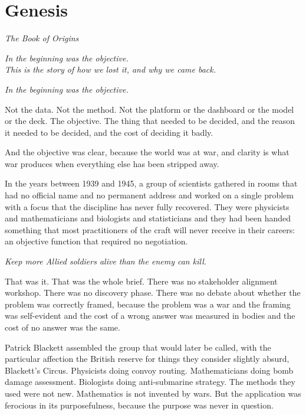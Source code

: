 \chapter{Genesis}
\begin{center}
  \small\itshape The Book of Origins
\end{center}
\vspace{0.5em}
\begin{center}
  \itshape In the beginning was the objective.\\
  This is the story of how we lost it, and why we came back.
\end{center}
\vspace{2em}

\begin{center}
  \itshape In the beginning was the objective.
\end{center}
\vspace{1em}

Not the data. Not the method. Not the platform or the dashboard or the model or the deck. The objective. The thing that needed to be decided, and the reason it needed to be decided, and the cost of deciding it badly.

And the objective was clear, because the world was at war, and clarity is what war produces when everything else has been stripped away.

In the years between 1939 and 1945, a group of scientists gathered in rooms that had no official name and no permanent address and worked on a single problem with a focus that the discipline has never fully recovered. They were physicists and mathematicians and biologists and statisticians and they had been handed something that most practitioners of the craft will never receive in their careers: an objective function that required no negotiation.

\vspace{1em}
\textit{Keep more Allied soldiers alive than the enemy can kill.}
\vspace{1em}

That was it. That was the whole brief. There was no stakeholder alignment workshop. There was no discovery phase. There was no debate about whether the problem was correctly framed, because the problem was a war and the framing was self-evident and the cost of a wrong answer was measured in bodies and the cost of no answer was the same.

Patrick Blackett assembled the group that would later be called, with the particular affection the British reserve for things they consider slightly absurd, Blackett's Circus. Physicists doing convoy routing. Mathematicians doing bomb damage assessment. Biologists doing anti-submarine strategy. The methods they used were not new. Mathematics is not invented by wars. But the application was ferocious in its purposefulness, because the purpose was never in question.

